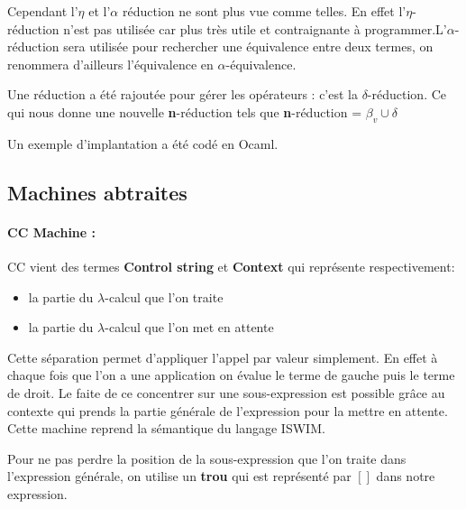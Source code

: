 \documentclass[10pt,a4paper]{article}
\begin{document}
				Cependant l'$\eta$ et l'$\alpha$ réduction ne sont plus vue comme telles. En effet l'$\eta$-réduction n'est pas utilisée car plus très utile et contraignante à programmer.L'$\alpha$-réduction sera utilisée pour rechercher une équivalence entre deux termes, on renommera d'ailleurs l'équivalence en $\alpha$-équivalence.
				\medbreak
				
				Une réduction a été rajoutée pour gérer les opérateurs : c'est la $\delta$-réduction. Ce qui nous donne une nouvelle \textbf{n}-réduction tels que \textbf{n}-réduction = $\beta_{v} \cup \delta$
				\bigbreak
				
				Un exemple d'implantation a été codé en Ocaml.
				\newpage
				
				
				
		\subsection{Machines abtraites}
		
			\paragraph{CC Machine :} CC vient des termes \textbf{Control string} et \textbf{Context} qui représente respectivement:
				\begin{itemize}
					\item la partie du $\lambda$-calcul que l'on traite
					\item la partie du $\lambda$-calcul que l'on met en attente 
				\end{itemize}
				Cette séparation permet d'appliquer l'appel par valeur simplement. En effet à chaque fois que l'on a une application on évalue le terme de gauche puis le terme de droit. Le faite de ce concentrer sur une sous-expression est possible grâce au contexte qui prends la partie générale de l'expression pour la mettre en attente. Cette machine reprend la sémantique du langage ISWIM. 
				\medbreak
				
				Pour ne pas perdre la position de la sous-expression que l'on traite dans l'expression générale, on utilise un \textbf{trou} qui est représenté par $[]$ dans notre expression.
				\bigbreak
				
\end{document}
